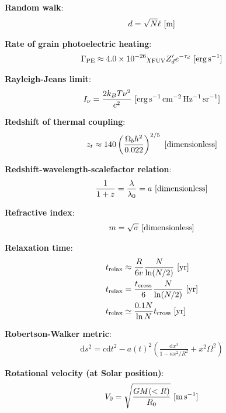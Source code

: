 \documentclass[a4paper,10pt]{article}
\begin{document}
{\noindent}\textbf{Random walk}:
\begin{align*}
    d = \sqrt{N}\ell ~ [{\rm m}]
\end{align*}

{\noindent}\textbf{Rate of grain photoelectric heating}:
\begin{align*}
    \Gamma_{\rm PE} \approx 4.0\times10^{-26}\chi_{\rm FUV}Z_d'e^{-\tau_d} ~ [{\rm erg\,s^{-1}}]
\end{align*}

{\noindent}\textbf{Rayleigh-Jeans limit}:
\begin{align*}
    I_\nu = \frac{2k_BT\nu^2}{c^2} ~ [{\rm erg\,s^{-1}\,cm^{-2}\,Hz^{-1}\,sr^{-1}}]
\end{align*}

{\noindent}\textbf{Redshift of thermal coupling}:
\begin{align*}
    z_t \approx 140\left(\frac{\Omega_bh^2}{0.022}\right)^{2/5} ~ [{\rm dimensionless}]
\end{align*}

{\noindent}\textbf{Redshift-wavelength-scalefactor relation}:
\begin{align*}
    \frac{1}{1+z} = \frac{\lambda}{\lambda_0} = a ~ [{\rm dimensionless}]
\end{align*}

{\noindent}\textbf{Refractive index}:
\begin{align*}
    m=\sqrt{\sigma} ~ [{\rm dimensionless}]
\end{align*}

{\noindent}\textbf{Relaxation time}:
\begin{align*}
    t_\mathrm{relax} &\approx \frac{R}{6v} \frac{N}{\ln(N/2)} ~ [{\rm yr}] \\
    t_\mathrm{relax} &= \frac{t_\mathrm{cross}}{6} \frac{N}{\ln(N/2)} ~ [{\rm yr}] \\
    t_{\rm relax} &\simeq \frac{0.1N}{\ln N} t_{\rm cross} ~ [{\rm yr}]
\end{align*}

{\noindent}\textbf{Robertson-Walker metric}:
\begin{align*}
    \mathrm{d}s^2 = c\mathrm{d}t^2 -a(t)^2 \left( \frac{\mathrm{d}x^2}{1-\kappa x^2/R^2} + x^2\Omega^2 \right)
\end{align*}

{\noindent}\textbf{Rotational velocity (at Solar position)}:
\begin{align*}
    V_0 = \sqrt{\frac{GM(<R)}{R_0}} ~ [{\rm m\,s^{-1}}]
\end{align*}
\end{document}
